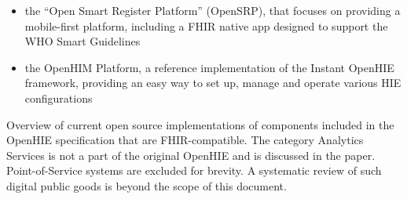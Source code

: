 \documentclass[
  authoryear]{elsarticle}
\providecommand{\tightlist}{%
  \setlength{\itemsep}{0pt}\setlength{\parskip}{0pt}}\usepackage{longtable,booktabs,array}
\begin{document}
\begin{itemize}
\tightlist
\item
  the ``Open Smart Register Platform'' (OpenSRP), that focuses on
  providing a mobile-first platform, including a FHIR native app
  designed to support the WHO Smart Guidelines
\item
  the OpenHIM Platform, a reference implementation of the Instant
  OpenHIE framework, providing an easy way to set up, manage and operate
  various HIE configurations
\end{itemize}

\begin{table}

\caption{\label{tbl-digital-public-goods}Overview of current open source
implementations of components included in the OpenHIE specification that
are FHIR-compatible. The category Analytics Services is not a part of
the original OpenHIE and is discussed in the paper. Point-of-Service
systems are excluded for brevity. A systematic review of such digital
public goods is beyond the scope of this document.}


\end{table}%
\end{document}
